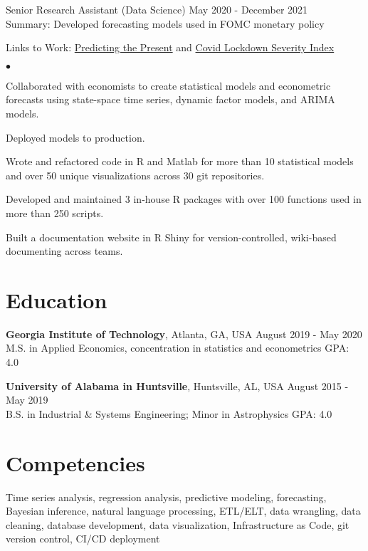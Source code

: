\documentclass[margin, line]{res}
\newenvironment{list2}{
  \begin{list}{$\bullet$}{%
      \setlength{\itemsep}{0.04in}
      \setlength{\parsep}{0in} \setlength{\parskip}{0in}
      \setlength{\topsep}{0.05in} \setlength{\partopsep}{0in} 
      \setlength{\leftmargin}{\dimexpr 26pt-0.05in}}}
    {\end{list}}
\begin{document}
\begin{resume}
Senior Research Assistant (Data Science) \hfill May 2020 - December 2021 \\
\hspace*{3mm}
    Summary: Developed forecasting models used in FOMC monetary policy
\vspace{-3mm}

\hspace*{3mm}
    Links to Work:  \href{https://michaelboerman.medium.com/predicting-the-present-a56ff704af0b}{Predicting the Present} and   \href{https://github.com/michaelboerman/lockdown_severity_index#readme}{Covid Lockdown Severity Index}
    
    \begin{list2}
        \item Collaborated with economists to create statistical models and econometric forecasts using state-space time series, dynamic factor models, and ARIMA models.
        \item Deployed models to production.
        \item Wrote and refactored code in R and Matlab for more than 10 statistical models and over 50 unique visualizations across 30 git repositories. 
        \item Developed and maintained 3 in-house R packages with over 100 functions used in more than 250 scripts.
        \item Built a documentation website in R Shiny for version-controlled, wiki-based documenting across teams.
    \end{list2}


\section{\sc Education }

{\bf Georgia Institute of Technology}, Atlanta, GA, USA \hfill August 2019 - May 2020\\
M.S. in Applied Economics, concentration in statistics and econometrics \hfill GPA: 4.0


{\bf University of Alabama in Huntsville}, Huntsville, AL, USA \hfill August 2015 - May 2019 \\
B.S. in Industrial \& Systems Engineering; Minor in Astrophysics \hfill GPA: 4.0

\section{\sc Competencies} 
Time series analysis, regression analysis, predictive modeling, forecasting, Bayesian inference, natural language processing, ETL/ELT, data wrangling, data cleaning, database development, data visualization, Infrastructure as Code, git version control, CI/CD deployment


\end{resume}
\end{document}
